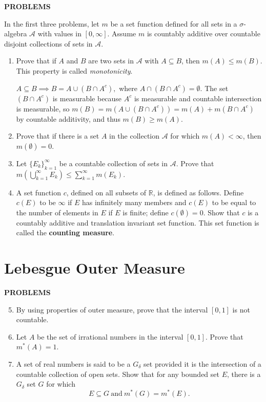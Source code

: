 \documentclass[a4paper,10pt]{book}
\theoremstyle{plain} %
\begin{document}
\begin{center}
	\textbf{PROBLEMS}
\end{center}
In the first three problems, let $m$ be a set function defined for all sets in a $\sigma$-algebra $\mathcal{A}$ with values in $[0,\infty]$. Assume $m$ is countably additive over countable disjoint collections of sets in $\mathcal{A}$.
\begin{enumerate}
	\setcounter{enumi}{0}
	\item Prove that if $A$ and $B$ are two sets in $\mathcal{A}$ with $A \subseteq B$, then $m(A) \le m(B)$. This property is called \textit{monotonicity}.\par
	$A \subseteq B \implies B = A \cup (B \cap A^c),$ where $A \cap (B \cap A^c) = \emptyset$. The set $(B \cap A^c)$ is measurable because $A^c$ is measurable and countable intersection is measurable, so $m(B) = m(A \cup (B \cap A^c)) = 	m(A) + m(B \cap A^c)$ by countable additivity, and thus $m(B) \ge m(A)$.
	\item Prove that if there is a set $A$ in the collection $\mathcal{A}$ for which $m(A) < \infty$, then $m(\emptyset) = 0$.\par
	
	\item Let $\{E_k\}_{k=1}^\infty$ be a countable collection of sets in $\mathcal{A}$. Prove that $m(\bigcup_{k=1}^\infty E_k) \le \sum_{k=1}^\infty m(E_k).$
	\item A set function $c$, defined on all subsets of $\mathbb{R}$, is defined as follows.
	Define $c(E)$ to be $\infty$ if $E$ has infinitely many members and $c(E)$ to be equal to the number of elements in $E$ if $E$ is finite; define $c(\emptyset)=0$. Show that $c$ is a countably additive and translation invariant set function. This set function is called the \textbf{counting measure}.
\end{enumerate}


\section{Lebesgue Outer Measure}

\begin{center}
	\textbf{PROBLEMS}
\end{center}
\begin{enumerate}
	\setcounter{enumi}{4}
	\item By using properties of outer measure, prove that the interval $[0,1]$ is not countable.
	\item Let $A$ be the set of irrational numbers in the interval $[0,1]$. Prove that $m^*(A)=1$.
	\item A set of real numbers is said to be a $G_\delta$ set provided it is the intersection of a countable collection of open sets.
	Show that for any bounded set $E$, there is a $G_\delta$ set $G$ for which
	\[E\subseteq G \ \text{and}\ m^*(G)=m^*(E).\] 
\end{enumerate}
\end{document}
